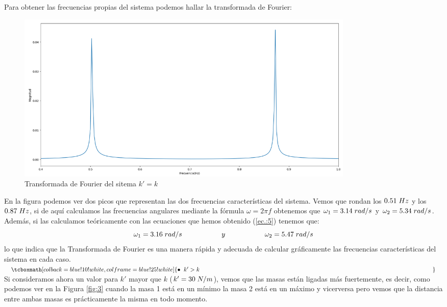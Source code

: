 \documentclass{article}
\begin{document}
Para obtener las frecuencias propias del sistema podemos hallar la transformada de Fourier:
\begin{figure}[H]
    \centering
    \includegraphics[width=0.8\textwidth]{fourier_k_iguales}
\caption{Transformada de Fourier del sitema $k'=k$}
\label{fig:f1}
\end{figure}
En la figura podemos ver dos picos que representan las dos frecuencias características del sistema. Vemos que rondan los $0.51\hspace{0.1cm} Hz$ y los $0.87\hspace{0.1cm} Hz$, si de aquí calculamos las frecuencias angulares mediante la fórmula $\omega = 2\pi f$ obtenemos que $\omega_1 = 3.14 \hspace{0.1cm}rad/s$ y $\omega_2 = 5.34\hspace{0.1cm}rad/s$. Además, si las calculamos teóricamente con las ecuaciones que hemos obtenido (\ref{ec.:5}) tenemos que:
$$\omega_1 = 3.16\hspace{0.1cm}rad/s \hspace{2cm}y\hspace{2cm}  \omega_2 = 5.47\hspace{0.1cm}rad/s$$
lo que indica que la Transformada de Fourier es una manera rápida y adecuada de calcular gráficamente las frecuencias características del sistema en cada caso.\newline\linebreak
\noindent$\tcboxmath[colback=blue!10!white,colframe=blue!25!white]{\bullet\hspace{0.2cm} k'>k\hspace{14cm}}\label{ec.:4}$\newline\linebreak
Si consideramos ahora un valor para $k'$ mayor que $k$ ($k'=30\hspace{0.1cm}N/m$), vemos que las masas están ligadas más fuertemente, es decir, como podemos ver en la Figura \ref{fig:3} cuando la masa 1 está en un mínimo la masa 2 está en un máximo y vicerversa pero vemos que la distancia entre ambas masas es prácticamente la misma en todo momento.\newline\linebreak
\end{document}
